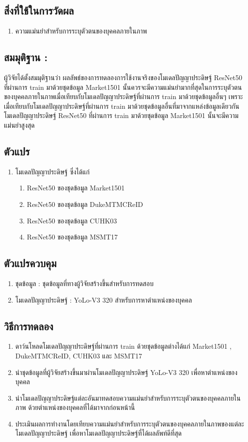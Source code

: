 \subsection*{สิ่งที่ใช้ในการวัดผล}
	\begin{enumerate}
		\item ความแม่นยำสำหรับการระบุตัวตนของบุคคลภายในภาพ
	\end{enumerate}
\subsection*{สมมุติฐาน :}ผู้วิจัยได้ตั้งสมมุติฐานว่า ผลลัพธ์ของการทดลองการใช้งานจริงของโมเดลปัญญาประดิษฐ์ ResNet50 ที่ผ่านการ train มาด้วยชุดข้อมูล Market1501 นั้นควรจะมีความแม่นยำมากที่สุดในการระบุตัวตนของบุคคลภายในภาพเมื่อเทียบกับโมเดลปัญญาประดิษฐ์ที่ผ่านการ train มาด้วยชุดข้อมูลอื่นๆ เพราะเมื่อเทียบกับโมเดลปัญญาประดิษฐ์ที่ผ่านการ train มาด้วยชุดข้อมูลอื่นที่มาจากแหล่งข้อมูลเดียวกัน โมเดลปัญญาประดิษฐ์ ResNet50 ที่ผ่านการ train มาด้วยชุดข้อมูล Market1501 นั้นจะมีความแม่นยำสูงสุด
\subsection*{ตัวแปร}
	\begin{enumerate}
		\item โมเดลปัญญาประดิษฐ์ ซึ่งได้แก่
		\begin{enumerate}
			\item ResNet50 ของชุดข้อมูล Market1501
			\item ResNet50 ของชุดข้อมูล DukeMTMCReID
			\item ResNet50 ของชุดข้อมูล CUHK03	
			\item ResNet50 ของชุดข้อมูล MSMT17
		\end{enumerate}
	\end{enumerate}
\subsection*{ตัวแปรควบคุม}
	\begin{enumerate}
		\item ชุดข้อมูล : ชุดข้อมูลที่ทางผู้วิจัยสร้างขึ้นสำหรับการทดสอบ
		\item โมเดลปัญญาประดิษฐ์ : YoLo-V3 320  สำหรับการหาตำแหน่งของบุคคล
	\end{enumerate}
\subsection*{วิธีการทดลอง}
	\begin{enumerate}
		\item ดาว์นโหลดโมเดลปัญญาประดิษฐ์ที่ผ่านการ train ด้วยชุดข้อมูลต่างได้แก่ Market1501 , DukeMTMCReID, CUHK03 และ MSMT17
		\item นำชุดข้อมูลที่ผู้วิจัยสร้างขึ้นมาผ่านโมเดลปัญญาประดิษฐ์ YoLo-V3 320 เพื่อหาตำแหน่งของบุคคล
		\item นำโมเดลปัญญาประดิษฐ์แต่ละอันมาทดสอบความแม่นยำสำหรับการระบุตัวตนของบุคคลภายในภาพ ด้วยตำแหน่งของบุคคลที่ได้มาจากก่อนหน้านี้
		\item ประเมินผลการทำงานโดยเทียบความแม่นยำสำหรับการระบุตัวตนของบุคคลภายในภาพของแต่ละโมเดลปัญญาประดิษฐ์ เพื่อหาโมเดลปัญญาประดิษฐ์ที่ได้ผลลัพท์ดีที่สุด
\end{enumerate}
